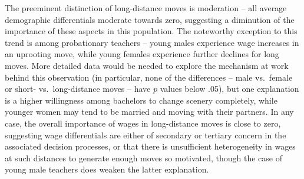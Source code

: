 \documentclass[12pt,]{article}
\begin{document}
The preeminent distinction of long-distance moves is moderation -- all
average demographic differentials moderate towards zero, suggesting a
diminution of the importance of these aspects in this population. The
noteworthy exception to this trend is among probationary teachers --
young males experience wage increases in an uprooting move, while young
females experience further declines for long moves. More detailed data
would be needed to explore the mechanism at work behind this observation
(in particular, none of the differences -- male vs.~female or short-
vs.~long-distance moves -- have \(p\) values below .05), but one
explanation is a higher willingness among bachelors to change scenery
completely, while younger women may tend to be married and moving with
their partners. In any case, the overall importance of wages in
long-distance moves is close to zero, suggesting wage differentials are
either of secondary or tertiary concern in the associated decision
processes, or that there is unsufficient heterogeneity in wages at such
distances to generate enough moves so motivated, though the case of
young male teachers does weaken the latter explanation.
\end{document}
